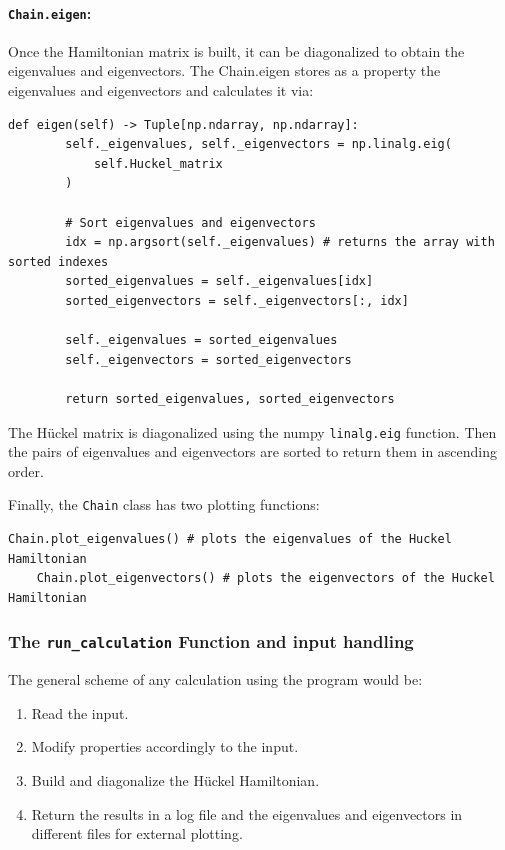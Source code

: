\documentclass{article}
\begin{document}
\paragraph{\texttt{Chain.eigen}:} Once the Hamiltonian matrix is built, it can be diagonalized to obtain the eigenvalues and eigenvectors. The Chain.eigen stores as a property the eigenvalues and eigenvectors and calculates it via: 
\begin{lstlisting}[backgroundcolor=\color{LightGray}]
    def eigen(self) -> Tuple[np.ndarray, np.ndarray]:
        self._eigenvalues, self._eigenvectors = np.linalg.eig(
            self.Huckel_matrix
        )
        
        # Sort eigenvalues and eigenvectors
        idx = np.argsort(self._eigenvalues) # returns the array with sorted indexes
        sorted_eigenvalues = self._eigenvalues[idx]
        sorted_eigenvectors = self._eigenvectors[:, idx]

        self._eigenvalues = sorted_eigenvalues
        self._eigenvectors = sorted_eigenvectors

        return sorted_eigenvalues, sorted_eigenvectors
\end{lstlisting} 
The Hückel matrix is diagonalized using the numpy \texttt{linalg.eig} function. Then the pairs of eigenvalues and eigenvectors are sorted to return them in ascending order. 

Finally, the \texttt{Chain} class has two plotting functions:
\begin{lstlisting}[backgroundcolor=\color{LightGray}]
    Chain.plot_eigenvalues() # plots the eigenvalues of the Huckel Hamiltonian
    Chain.plot_eigenvectors() # plots the eigenvectors of the Huckel Hamiltonian
\end{lstlisting} 

\subsubsection{The \texttt{run\_calculation} Function and input handling}
The general scheme of any calculation using the program would be:
\begin{enumerate}
    \item Read the input.
    \item Modify properties accordingly to the input.
    \item Build and diagonalize the Hückel Hamiltonian.
    \item Return the results in a log file and the eigenvalues and eigenvectors in different files for external plotting.
\end{enumerate}
\end{document}
